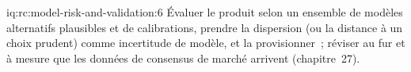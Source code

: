 \begin{solution}{iq:rc:model-risk-and-validation:6}
Évaluer le produit selon un ensemble de modèles alternatifs plausibles et de calibrations, prendre la dispersion
(ou la distance à un choix prudent) comme incertitude de modèle, et la provisionner~; réviser au fur et à mesure que
les données de consensus de marché arrivent (chapitre~27).
\end{solution}

